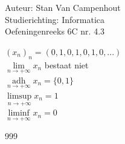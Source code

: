 \documentclass[a4paper]{article}
\begin{document}
  
\noindent \large Auteur: Stan Van Campenhout \\
\noindent \large Studierichting:  Informatica\\
\noindent \large Oefeningenreeks 6C nr. 4.3\\

\medskip

\normalsize

$ (x_n)_n = (0,1,0,1,0,1,0,...) $\\

$ \lim\limits_{n\rightarrow+\infty}x_n $ bestaat niet \\

$\displaystyle \mathop{\mathrm{adh}}\limits_{n \rightarrow +\infty} x_n = \{0,1\}$\\

$ \limsup\limits_{n\rightarrow+\infty} x_n = 1 $\\

$ \liminf\limits_{n\rightarrow+\infty} x_n = 0 $\\

\begin{thebibliography}{999}
\end{thebibliography}
\end{document}
